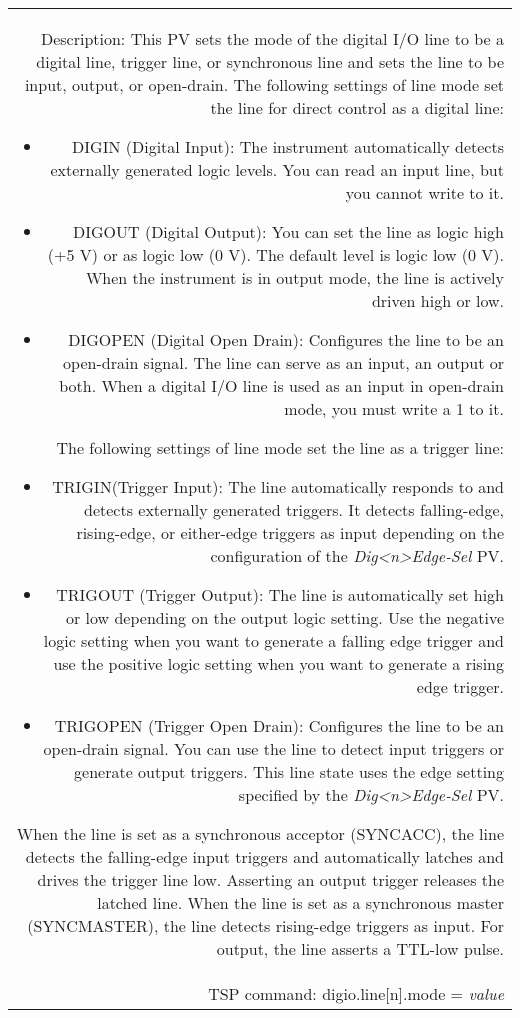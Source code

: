 \documentclass[openany]{article}
\begin{document}
\begin{tabular}{N}
			Description: This PV sets the mode of the digital I/O line to be a digital line, trigger line, or synchronous line and sets the line to be input, output, or open-drain. The following settings of line mode set the line for direct control as a digital line: \begin{itemize} \item DIGIN (Digital Input): The instrument automatically detects externally generated logic levels. You can read an input line, but you cannot write to it. \item DIGOUT (Digital Output): You can set the line as logic high (+5 V) or as logic low (0 V). The default level is logic low (0 V). When the instrument is in output mode, the line is actively driven high or low. \item DIGOPEN (Digital Open Drain): Configures the line to be an open-drain signal. The line can serve as an input, an output or both. When a digital I/O line is used as an input in open-drain mode, you must write a 1 to it. \end{itemize} The following settings of line mode set the line as a trigger line: \begin{itemize} \item TRIGIN(Trigger Input): The line automatically responds to and detects externally generated triggers. It detects falling-edge, rising-edge, or either-edge triggers as input depending on the configuration of the \emph{Dig{\textless n\textgreater}Edge-Sel} PV. \item TRIGOUT (Trigger Output): The line is automatically set high or low depending on the output logic setting. Use the negative logic setting when you want to generate a falling edge trigger and use the positive logic setting when you want to generate a rising edge trigger. \item TRIGOPEN (Trigger Open Drain): Configures the line to be an open-drain signal. You can use the line to detect input triggers or generate output triggers. This line state uses the edge setting specified by the \emph{Dig{\textless n\textgreater}Edge-Sel} PV. \end{itemize} When the line is set as a synchronous acceptor (SYNCACC), the line detects the falling-edge input triggers and automatically latches and drives the trigger line low. Asserting an output trigger releases the latched line. When the line is set as a synchronous master (SYNCMASTER), the line detects rising-edge triggers as input. For output, the line asserts a TTL-low pulse. \\
			TSP command: digio.line[n].mode = \emph{value}
		\end{tabular}
\end{document}
